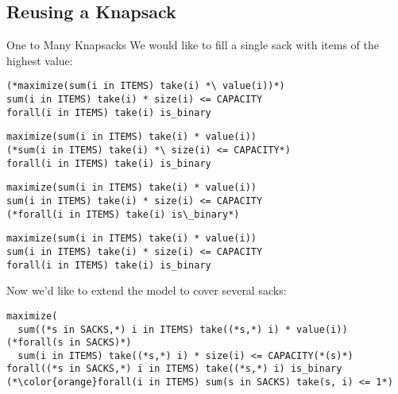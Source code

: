 \documentclass[smaller]{beamer}
\begin{document}
\subsection{Reusing a Knapsack}
\begin{frame}[fragile]{One to Many Knapsacks}
  We would like to fill a single sack with items of the highest value:
  \vspace{-2ex}
  \begin{overprint}
  \begin{lstlisting}[style=mosel]
(*maximize(sum(i in ITEMS) take(i) *\ value(i))*)
sum(i in ITEMS) take(i) * size(i) <= CAPACITY
forall(i in ITEMS) take(i) is_binary
  \end{lstlisting}

  \begin{lstlisting}[style=mosel]
maximize(sum(i in ITEMS) take(i) * value(i))
(*sum(i in ITEMS) take(i) *\ size(i) <= CAPACITY*)
forall(i in ITEMS) take(i) is_binary
  \end{lstlisting}

  \begin{lstlisting}[style=mosel]
maximize(sum(i in ITEMS) take(i) * value(i))
sum(i in ITEMS) take(i) * size(i) <= CAPACITY
(*forall(i in ITEMS) take(i) is\_binary*)
\end{lstlisting}

  \begin{lstlisting}[style=mosel]
maximize(sum(i in ITEMS) take(i) * value(i))
sum(i in ITEMS) take(i) * size(i) <= CAPACITY
forall(i in ITEMS) take(i) is_binary
  \end{lstlisting}
  \vspace{2ex}

  Now we'd like to extend the model to cover several sacks:
  \begin{lstlisting}[style=mosel]
maximize(
  sum((*s in SACKS,*) i in ITEMS) take((*s,*) i) * value(i))
(*forall(s in SACKS)*)
  sum(i in ITEMS) take((*s,*) i) * size(i) <= CAPACITY(*(s)*)
forall((*s in SACKS,*) i in ITEMS) take((*s,*) i) is_binary
(*\color{orange}forall(i in ITEMS) sum(s in SACKS) take(s, i) <= 1*)
\end{lstlisting}
  \end{overprint}
\end{frame}


\end{document}
